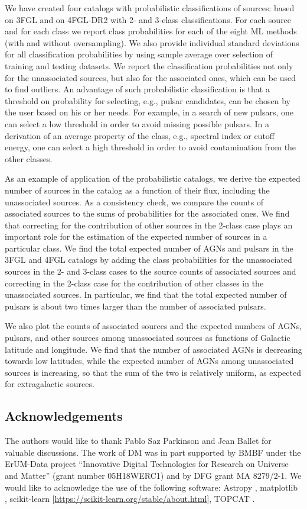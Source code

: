 We have created four catalogs with probabilistic classifications of sources: based on 3FGL and on 4FGL-DR2 with 2- and 3-class classifications.
For each source and for each class we report class probabilities for each of the eight ML methods (with and without oversampling). 
We also provide individual standard deviations for all classification probabilities by using sample average over selection of training and testing datasets.
We report the classification probabilities not only for the unassociated sources, but also for the associated ones, which can be used to find outliers.
An advantage of such probabilistic classification is that a threshold on probability for selecting, e.g., pulsar candidates, can be chosen by the user based on his or her needs.
For example, in a search of new pulsars, one can select a low threshold in order to avoid missing possible pulsars.
In a derivation of an average property of the class, e.g., spectral index or cutoff energy, one can select a high threshold in order to avoid contamination from the other classes.


As an example of application of the probabilistic catalogs, we derive the expected number of sources in the catalog as a function of their flux, including the unassociated sources.
As a consistency check, we compare the counts of associated sources to the sums of probabilities for the associated ones.
We find that correcting for the contribution of other sources in the 2-class case plays an important role for the estimation of the expected number of sources in a particular class.
We find the total expected number of AGNs and pulsars in the 3FGL and 4FGL catalogs by adding the class probabilities for the unassociated sources in the 2- and 3-class cases to the source counts of associated sources and correcting in the 2-class case for the contribution of other classes in the unassociated sources.
In particular, we find that the total expected number of pulsars is about two times larger than the number of associated pulsars.

We also plot the counts of associated sources and the expected numbers of AGNs, pulsars, and other sources among unassociated sources
as functions of Galactic latitude and longitude.
We find that the number of associated AGNs is decreasing towards low latitudes, while the expected number of AGNs among unassociated sources is increasing, so that the sum of the two is relatively uniform, as expected for extragalactic sources.


\subsection*{Acknowledgements}

The authors would like to thank Pablo Saz Parkinson and Jean Ballet for valuable discussions.
The work of DM was in part supported by BMBF under the ErUM-Data project ``Innovative Digital Technologies for Research on Universe and Matter'' (grant number 05H18WERC1) and by DFG grant MA 8279/2-1.
We would like to acknowledge the use of the following software:
Astropy \citep[\url{http://www.astropy.org},][]{2013A&A...558A..33A}, 
matplotlib \citep{Hunter:2007}, 
scikit-learn [\url{https://scikit-learn.org/stable/about.html}], 
TOPCAT \citep{2005ASPC..347...29T}.
